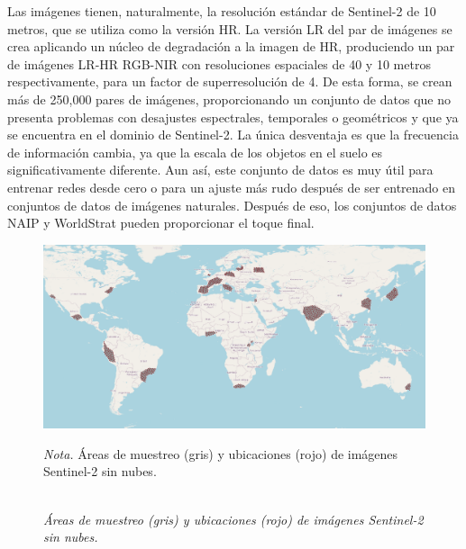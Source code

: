 Las imágenes tienen, naturalmente, la resolución estándar de Sentinel-2 de 10 metros, que se utiliza como la versión HR. La versión LR del par de imágenes se crea aplicando un núcleo de degradación a la imagen de HR, produciendo un par de imágenes LR-HR RGB-NIR con resoluciones espaciales de 40 y 10 metros respectivamente, para un factor de superresolución de 4. De esta forma, se crean más de 250,000 pares de imágenes, proporcionando un conjunto de datos que no presenta problemas con desajustes espectrales, temporales o geométricos y que ya se encuentra en el dominio de Sentinel-2. La única desventaja es que la frecuencia de información cambia, ya que la escala de los objetos en el suelo es significativamente diferente. Aun así, este conjunto de datos es muy útil para entrenar redes desde cero o para un ajuste más rudo después de ser entrenado en conjuntos de datos de imágenes naturales. Después de eso, los conjuntos de datos NAIP y WorldStrat pueden proporcionar el toque final.

\begin{figure}[H] 
    \caption{\doublespacing \\ \textit{Áreas de muestreo (gris) y ubicaciones (rojo) de imágenes Sentinel-2 sin nubes.}} 
    \centering
    \includegraphics[width=1\linewidth]{images/sampling_locations.png}
    \begin{justify}
        \textit{Nota.} Áreas de muestreo (gris) y ubicaciones (rojo) de imágenes Sentinel-2 sin nubes.
    \end{justify}                    
    \label{fig:sampling_sites}
\end{figure}

